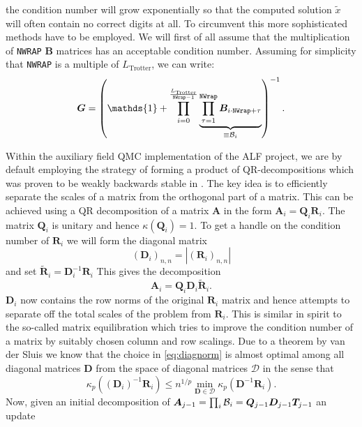 the condition number  will grow exponentially so that the computed solution $\tilde{x}$
will often contain no correct digits at all.
To circumvent this more sophisticated methods have to be employed. We will first of all assume that the multiplication of \texttt{NWRAP} $\bm{B}$ matrices has an acceptable condition number.
Assuming for simplicity that \texttt{NWRAP} is a multiple of $L_{\text{Trotter}}$, we can write:
\begin{equation}
\bm{G} = \left( \mathds{1} + \prod\limits_{ i = 0}^{\frac{L_{\text{Trotter}}} {\texttt{NWrap} -1}}       \underbrace{\prod_{\tau=1}^{\texttt{NWrap}} \bm{B}_{i  \cdot  \texttt{NWrap}+ \tau} }_{ \equiv {\cal \bm{B}}_i}\right)^{-1}.
\end{equation}

Within the auxiliary field QMC implementation of the ALF project, we are by default employing
the strategy of forming a product of QR-decompositions which was proven to be weakly backwards stable in \cite{Bai2011}.
The key idea is to efficiently separate the scales of a matrix from the orthogonal part of a matrix.
This can be achieved using a QR decomposition of a matrix $\bm{A}$ in the form $\bm{A}_i = \bm{Q}_i \bm{R}_i$. The matrix $\bm{Q}_i$ is unitary and hence $\kappa(\bm{Q}_i) = 1$.
To get a handle on the condition number of $\bm{R}_i$ we will form the
diagonal matrix
\begin{equation}
(\bm{D}_i)_{n,n} = |(\bm{R}_i)_{n,n}|
\label{eq:diagnorm}
\end{equation}
and set $\tilde{\bm{R}}_i = \bm{D}_i^{-1} \bm{R}_i$
This gives the decomposition
\begin{equation}
\bm{A}_i = \bm{Q}_i \bm{D}_i \tilde{\bm{R}}_i.
\end{equation}
$\bm{D}_i$ now contains the row norms of the original $\bm{R}_i$ matrix and hence attempts to separate off the total scales of the problem from $\bm{R}_i$.
This is similar in spirit to the so-called matrix equilibration which tries to improve the condition number of a matrix by suitably chosen column and row scalings.
Due to a theorem by van der Sluis \cite{vanderSluis1969} we know that the choice in \eqref{eq:diagnorm} is almost optimal among all diagonal matrices $\bm{D}$ from the space of diagonal matrices 
$\mathcal{D}$ in the sense that
\begin{equation*}
\kappa_p((\bm{D}_i)^{-1} \bm{R}_i ) \leq n^{1/p} \min_{\bm{D} \in \mathcal{D}} \kappa_p(\bm{D}^{-1} \bm{R}_i).
\end{equation*}
Now, given an initial decomposition of $\bm{A}_{j-1} = \prod_i {\cal \bm{B}}_i = \bm{Q}_{j-1} \bm{D}_{j-1} \bm{T}_{j-1}$ an update
